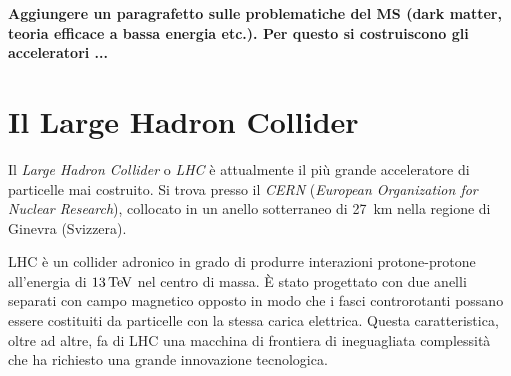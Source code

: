 %
%

{\bf Aggiungere un paragrafetto sulle problematiche del MS (dark matter, teoria efficace a bassa energia etc.). Per questo si costruiscono gli acceleratori ...}

\section{Il Large Hadron Collider}
Il {\em Large Hadron Collider} o {\em LHC} \cite{Evans:2008zzb} è attualmente il più grande acceleratore di particelle mai costruito. Si trova presso il {\em CERN} ({\em European Organization for Nuclear Research}), collocato in un anello sotterraneo di 27~km nella regione di Ginevra (Svizzera). 

LHC \`e un collider adronico in grado di produrre interazioni protone-protone all'energia di $13{\rm \, Te\kern-0.125em V}$ nel centro di massa. \`E stato progettato con due anelli separati con campo magnetico opposto in modo che i fasci controrotanti possano essere costituiti da particelle con la stessa carica elettrica. Questa caratteristica, oltre ad altre, fa di LHC una macchina di frontiera di ineguagliata complessit\`a che ha richiesto una grande innovazione tecnologica. 

